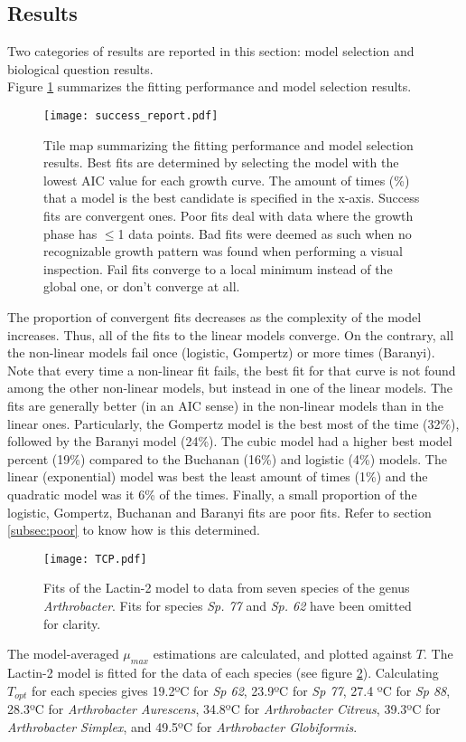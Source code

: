 \documentclass[titlepage,11pt]{article}
\begin{document}
\begin{linenumbers}
			\section{Results}
			Two categories of results are reported in this section: model selection and biological question results. \\
			Figure \ref{fig:success_report} summarizes the fitting performance and model selection results.
			\begin{figure}[h!]
				\texttt{[image: success\_report.pdf]}
				\centering
				\caption{Tile map summarizing the fitting performance and model selection results. Best fits are determined by selecting the model with the lowest AIC value for each growth curve. The amount of times (\%) that a model is the best candidate is specified in the x-axis. Success fits are convergent ones. Poor fits deal with data where the growth phase has $ \leq $1 data points. Bad fits were deemed as such when no recognizable growth pattern was found when performing a visual inspection. Fail fits converge to a local minimum instead of the global one, or don't converge at all.}
				\label{fig:success_report}
			\end{figure}
			The proportion of convergent fits decreases as the complexity of the model increases. Thus, all of the fits to the linear models converge. On the contrary, all the non-linear models fail once (logistic, Gompertz) or more times (Baranyi). Note that every time a non-linear fit fails, the best fit for that curve is not found among the other non-linear models, but instead in one of the linear models. The fits are generally better (in an AIC sense) in the non-linear models than in the linear ones. Particularly, the Gompertz model is the best most of the time (32\%), followed by the Baranyi model (24\%). The cubic model had a higher best model percent (19\%) compared to the Buchanan (16\%) and logistic (4\%) models. The linear (exponential) model was best the least amount of times (1\%) and the quadratic model was it 6\% of the times. Finally, a small proportion of the logistic, Gompertz, Buchanan and Baranyi fits are poor fits. Refer to section \ref{subsec:poor} to know how is this determined.\\
			\begin{figure}[h]
				\texttt{[image: TCP.pdf]}
				\centering
				\caption{Fits of the Lactin-2 model to data from seven species of the genus \textit{Arthrobacter}. Fits for species \textit{Sp. 77} and \textit{Sp. 62} have been omitted for clarity.}
				\label{fig:TCP}
			\end{figure}
			The model-averaged $ \mu_{max} $  estimations are calculated, and plotted against $ T $. The Lactin-2 model is fitted for the data of each species (see figure \ref{fig:TCP}). Calculating $ T_{opt} $ for each species gives 19.2ºC for \textit{Sp 62}, 23.9ºC for \textit{Sp 77}, 27.4 ºC for \textit{Sp 88}, 28.3ºC for \textit{Arthrobacter Aurescens}, 34.8ºC for \textit{Arthrobacter Citreus}, 39.3ºC for \textit{Arthrobacter Simplex}, and 49.5ºC for \textit{Arthrobacter Globiformis}. 

\end{linenumbers}
\end{document}
